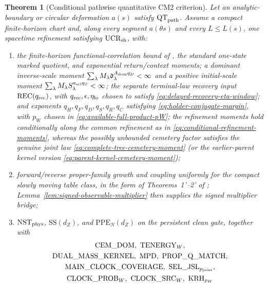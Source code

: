 \documentclass[11pt]{article}
\newtheorem{theorem}{Theorem}[section]
\begin{document}
\begin{theorem}[Conditional pathwise quantitative CM2 criterion]
\label{thm:global-cm2-assembly}
Let an analytic-boundary or circular deformation $a(s)$ satisfy
$\mathrm{QT}_{\rm path}$.
Assume a compact finite-horizon chart and, along every segment
$a(\theta s)$ and every $L\le L(s)$, one spacetime refinement satisfying
$\mathrm{UCR}_{\rm sh}$, with:
\begin{enumerate}[label=\textup{(H\arabic*)}]
\item the finite-horizon functional-correlation bound of \cite{LS}, the
      standard one-state marked quotient, and exponential return/context
      moments; a dominant inverse-scale moment
      $\sum_\lambda M_\lambda
      \mathfrak d_\lambda^{A_{\rm dom}q_D}<\infty$ and a positive initial-scale
      moment $\sum_\lambda M_\lambda
      S_\lambda^{a_{\rm scl}q_S}<\infty$; the separate terminal-law
      recovery input $\mathrm{REC}(q_{\rm rec})$, with
      $q_{\rm rec},\epsilon,\eta_{\rm lo}$ chosen to satisfy
      \eqref{eq:delayed-recovery-eta-window}; and
      exponents $q_H,q_F,q_D,q_S,q_R,q_C$ satisfying
      \eqref{eq:holder-conjugate-margin}, with $p_W$ chosen in
      \eqref{eq:available-full-product-pW}; the refinement moments hold
      conditionally along the common refinement as in
      \eqref{eq:conditional-refinement-moments}, whereas the possibly
      unbounded cemetery factor satisfies the genuine joint law
      \eqref{eq:complete-tree-cemetery-moment} (or the earlier-parent kernel
      version \eqref{eq:parent-kernel-cemetery-moment});
\item forward/reverse proper-family growth and coupling uniformly for the
      compact slowly moving table class, in the form of Theorems~1'--2' of
      \cite{SYZ}; Lemma~\ref{lem:signed-observable-multiplier} then supplies
      the signed multiplier bridge;
\item $\mathrm{NST}_{\rm phys}$, $\mathrm{SS}(d_Z)$, and
      $\mathrm{PPE}_{N}(d_Z)$ on the persistent clean gate, together with
      \[
       \begin{gathered}
       \mathrm{CEM\_DOM},\ \mathrm{TENERGY}_{W},\\
       \mathrm{DUAL\_MASS\_KERNEL},\ \mathrm{MPD},\
       \mathrm{PROP\_Q\_MATCH},\\
       \mathrm{MAIN\_CLOCK\_COVERAGE},\
       \mathrm{SEL\_JSL}_{p_{\rm joint}},\\
       \mathrm{CLOCK\_PROB}_{W},\ \mathrm{CLOCK\_SRC}_{W},\
       \mathrm{KRH}_{p_W}
       \end{gathered}
\]
\end{enumerate}
\end{theorem}
\end{document}
